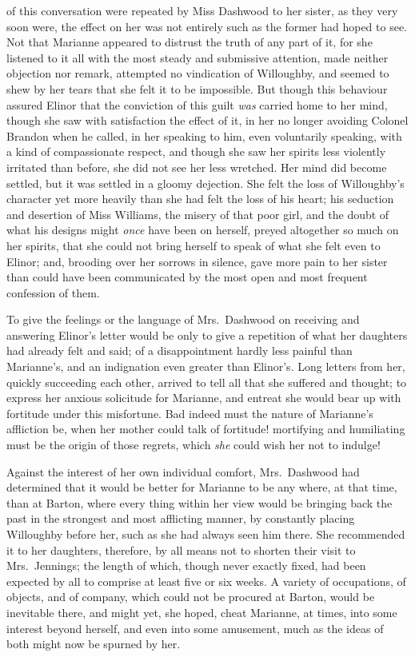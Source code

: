  of this conversation were repeated
by Miss Dashwood to her sister, as they very soon were,
the effect on her was not entirely such as the former
had hoped to see.  Not that Marianne appeared to distrust
the truth of any part of it, for she listened to it all
with the most steady and submissive attention, made neither
objection nor remark, attempted no vindication of Willoughby,
and seemed to shew by her tears that she felt it to
be impossible.  But though this behaviour assured Elinor
that the conviction of this guilt \emph{was} carried home to
her mind, though she saw with satisfaction the effect of it,
in her no longer avoiding Colonel Brandon when he called,
in her speaking to him, even voluntarily speaking,
with a kind of compassionate respect, and though she
saw her spirits less violently irritated than before,
she did not see her less wretched.  Her mind did become
settled, but it was settled in a gloomy dejection.
She felt the loss of Willoughby's character yet more heavily
than she had felt the loss of his heart; his seduction and
desertion of Miss Williams, the misery of that poor girl,
and the doubt of what his designs might \emph{once} have been
on herself, preyed altogether so much on her spirits,
that she could not bring herself to speak of what she felt
even to Elinor; and, brooding over her sorrows in silence,
gave more pain to her sister than could have been communicated
by the most open and most frequent confession of them.

To give the feelings or the language of Mrs.\ Dashwood
on receiving and answering Elinor's letter would be only
to give a repetition of what her daughters had already felt
and said; of a disappointment hardly less painful than
Marianne's, and an indignation even greater than Elinor's.
Long letters from her, quickly succeeding each other,
arrived to tell all that she suffered and thought;
to express her anxious solicitude for Marianne, and entreat
she would bear up with fortitude under this misfortune.
Bad indeed must the nature of Marianne's affliction be,
when her mother could talk of fortitude! mortifying
and humiliating must be the origin of those regrets,
which \emph{she} could wish her not to indulge!

Against the interest of her own individual comfort,
Mrs.\ Dashwood had determined that it would be better for
Marianne to be any where, at that time, than at Barton,
where every thing within her view would be bringing back
the past in the strongest and most afflicting manner,
by constantly placing Willoughby before her, such as
she had always seen him there.  She recommended it to
her daughters, therefore, by all means not to shorten their
visit to Mrs.\ Jennings; the length of which, though never
exactly fixed, had been expected by all to comprise at least
five or six weeks.  A variety of occupations, of objects,
and of company, which could not be procured at Barton,
would be inevitable there, and might yet, she hoped,
cheat Marianne, at times, into some interest beyond herself,
and even into some amusement, much as the ideas of both
might now be spurned by her.

